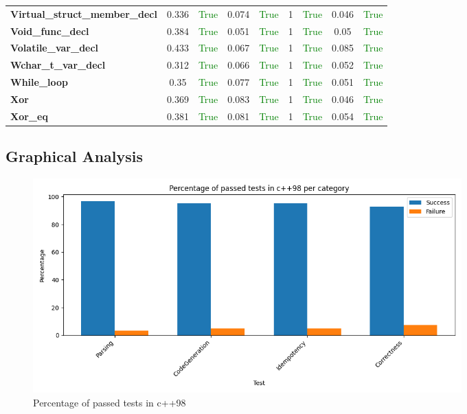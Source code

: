 \documentclass{article}
\begin{document}
\begin{xltabular}{\textwidth}{lcccccccc}
\textbf{{\fontsize{10}{12}\selectfont Virtual\_struct\_member\_decl}}& 0.336&\textcolor{green}{True}& 0.074&\textcolor{green}{True}& 1&\textcolor{green}{True}& 0.046&\textcolor{green}{True} \\[0.5ex]
\textbf{{\fontsize{10}{12}\selectfont Void\_func\_decl}}& 0.384&\textcolor{green}{True}& 0.051&\textcolor{green}{True}& 1&\textcolor{green}{True}& 0.05&\textcolor{green}{True} \\[0.5ex]
\textbf{{\fontsize{10}{12}\selectfont Volatile\_var\_decl}}& 0.433&\textcolor{green}{True}& 0.067&\textcolor{green}{True}& 1&\textcolor{green}{True}& 0.085&\textcolor{green}{True} \\[0.5ex]
\textbf{{\fontsize{10}{12}\selectfont Wchar\_t\_var\_decl}}& 0.312&\textcolor{green}{True}& 0.066&\textcolor{green}{True}& 1&\textcolor{green}{True}& 0.052&\textcolor{green}{True} \\[0.5ex]
\textbf{{\fontsize{10}{12}\selectfont While\_loop}}& 0.35&\textcolor{green}{True}& 0.077&\textcolor{green}{True}& 1&\textcolor{green}{True}& 0.051&\textcolor{green}{True} \\[0.5ex]
\textbf{{\fontsize{10}{12}\selectfont Xor}}& 0.369&\textcolor{green}{True}& 0.083&\textcolor{green}{True}& 1&\textcolor{green}{True}& 0.046&\textcolor{green}{True} \\[0.5ex]
\textbf{{\fontsize{10}{12}\selectfont Xor\_eq}}& 0.381&\textcolor{green}{True}& 0.081&\textcolor{green}{True}& 1&\textcolor{green}{True}& 0.054&\textcolor{green}{True} \\[0.5ex]
\bottomrule
\end{xltabular}
\newpage
\subsection{Graphical Analysis}
\begin{figure}[h!]
\centering
\includegraphics[width=0.8\textwidth]{../reports/clava/images/c++98_percentage.png}
\caption{Percentage of passed tests in c++98}
\label{fig:c++98_percentage}
\end{figure}
\newpage
\end{document}
